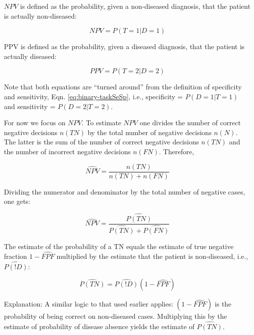 \documentclass[
]{book}
\begin{document}
\(NPV\) is defined as the probability, given a non-diseased diagnosis, that the patient is actually non-diseased:

\begin{equation} 
NPV = P(T=1|D=1)
\label{eq:binary-taskNPV1}
\end{equation}

PPV is defined as the probability, given a diseased diagnosis, that the patient is actually diseased:

\begin{equation} 
PPV = P(T=2|D=2)
\label{eq:binary-taskPPV1}
\end{equation}

Note that both equations are ``turned around'' from the definition of specificity and sensitivity, Eqn. \eqref{eq:binary-taskSeSp}, i.e., specificity = \(P(D=1|T=1)\) and sensitivity = \(P(D=2|T=2)\).

For now we focus on \(NPV\). To estimate \(NPV\) one divides the number of correct negative decisions \(n(TN)\) by the total number of negative decisions \(n(N)\). The latter is the sum of the number of correct negative decisions \(n(TN)\) and the number of incorrect negative decisions \(n(FN)\). Therefore,

\begin{equation} 
\widehat{NPV}=\frac{n(TN)}{n(TN)+n(FN)}
\label{eq:binary-taskNPV2}
\end{equation}

Dividing the numerator and denominator by the total number of negative cases, one gets:

\begin{equation} 
\widehat{NPV}=\frac{\widehat{P(TN)}}{\widehat{P(TN)}+\widehat{P(FN)}}
\label{eq:binary-taskNPV3}
\end{equation}

The estimate of the probability of a TN equals the estimate of true negative fraction \(1-\widehat{FPF}\) multiplied by the estimate that the patient is non-diseased, i.e., \(\widehat{P(!D)}\):

\begin{equation} 
\widehat{P(TN)}=\widehat{P(!D)}(1-\widehat{FPF})
\label{eq:binary-taskPTNEst}
\end{equation}

Explanation: A similar logic to that used earlier applies: \((1-\widehat{FPF})\) is the probability of being correct on non-diseased cases. Multiplying this by the estimate of probability of disease absence yields the estimate of \(\widehat{P(TN)}\).
\end{document}
